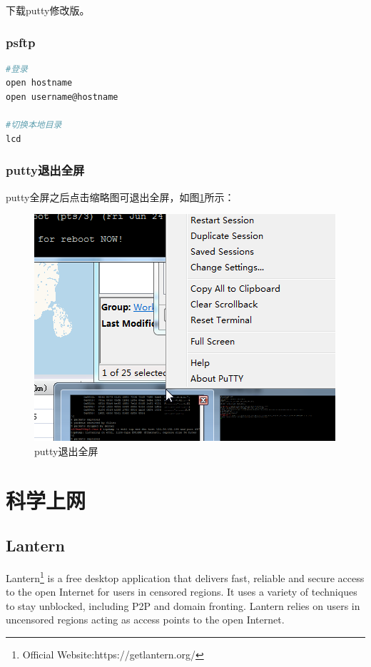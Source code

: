 \documentclass{book}
\begin{document}
下载putty修改版。

\subsection{psftp}

\begin{lstlisting}[language=Bash]
#登录
open hostname
open username@hostname

#切换本地目录
lcd
\end{lstlisting}

\subsection{putty退出全屏}

putty全屏之后点击缩略图可退出全屏，如图\ref{fig:puttyExistsFullScreen}所示：

\begin{figure}[htbp]
	\centering
	\includegraphics[scale=0.6]{puttyExistsFullScreen.png}
	\caption{putty退出全屏}
	\label{fig:puttyExistsFullScreen}
\end{figure}


\chapter{科学上网}

\section{Lantern}

Lantern\footnote{Official Website:https://getlantern.org/} is a free desktop application that delivers fast, 
reliable and secure access to the open Internet for users in censored regions. 
It uses a variety of techniques to stay unblocked, including P2P and domain fronting. 
Lantern relies on users in uncensored regions acting as access points to the open Internet. 
\end{document}
